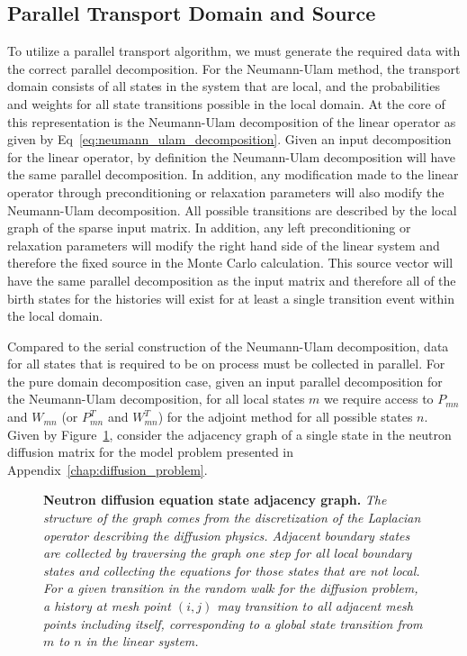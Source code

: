 \subsection{Parallel Transport Domain and Source }
\label{subsec:domain_generation}
To utilize a parallel transport algorithm, we must generate the
required data with the correct parallel decomposition. For the
Neumann-Ulam method, the transport domain consists of all states in
the system that are local, and the probabilities and weights for all
state transitions possible in the local domain. At the core of this
representation is the Neumann-Ulam decomposition of the linear
operator as given by Eq~\ref{eq:neumann_ulam_decomposition}. Given an
input decomposition for the linear operator, by definition the
Neumann-Ulam decomposition will have the same parallel
decomposition. In addition, any modification made to the linear
operator through preconditioning or relaxation parameters will also
modify the Neumann-Ulam decomposition. All possible transitions are
described by the local graph of the sparse input matrix. In addition,
any left preconditioning or relaxation parameters will modify the
right hand side of the linear system and therefore the fixed source in
the Monte Carlo calculation. This source vector will have the same
parallel decomposition as the input matrix and therefore all of the
birth states for the histories will exist for at least a single
transition event within the local domain.

Compared to the serial construction of the Neumann-Ulam decomposition,
data for all states that is required to be on process must be
collected in parallel. For the pure domain decomposition case, given
an input parallel decomposition for the Neumann-Ulam decomposition,
for all local states $m$ we require access to $P_{mn}$ and $W_{mn}$
(or $P^T_{mn}$ and $W^T_{mn}$) for the adjoint method for all possible
states $n$. Given by Figure~\ref{fig:diffusion_graph}, consider the
adjacency graph of a single state in the neutron diffusion matrix for
the model problem presented in Appendix~\ref{chap:diffusion_problem}.
\begin{figure}[t!]
  \begin{center}
    \scalebox{1.5}{  }
  \end{center}
  \caption{\textbf{Neutron diffusion equation state adjacency graph.}
    \textit{The structure of the graph comes from the discretization
      of the Laplacian operator describing the diffusion
      physics. Adjacent boundary states are collected by traversing
      the graph one step for all local boundary states and collecting
      the equations for those states that are not local. For a given
      transition in the random walk for the diffusion problem, a
      history at mesh point $(i,j)$ may transition to all adjacent
      mesh points including itself, corresponding to a global state
      transition from $m$ to $n$ in the linear system.}}
  \label{fig:diffusion_graph}
\end{figure}

